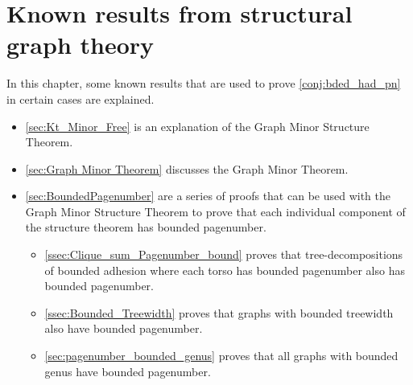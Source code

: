 
\chapter{Known results from structural graph theory}\label{chap:Known results}
In this chapter, some known results that are used to prove \cref{conj:bded_had_pn} in certain cases are explained.

\begin{itemize}
	\item \cref{sec:Kt_Minor_Free} is an explanation of the Graph Minor Structure Theorem.
	\item \cref{sec:Graph Minor Theorem} discusses the Graph Minor Theorem. 
	\item \cref{sec:BoundedPagenumber} are a series of proofs that can be used with the Graph Minor Structure Theorem to prove that each individual component of the structure theorem has bounded pagenumber.
	\begin{itemize}
		\item \cref{ssec:Clique_sum_Pagenumber_bound} proves that tree-decompositions of bounded adhesion where each torso has bounded pagenumber also has bounded pagenumber.
		\item \cref{ssec:Bounded_Treewidth} proves that graphs with bounded treewidth also have bounded pagenumber.
		\item \cref{sec:pagenumber_bounded_genus} proves that all graphs with bounded genus have bounded pagenumber.
	\end{itemize}
\end{itemize}





